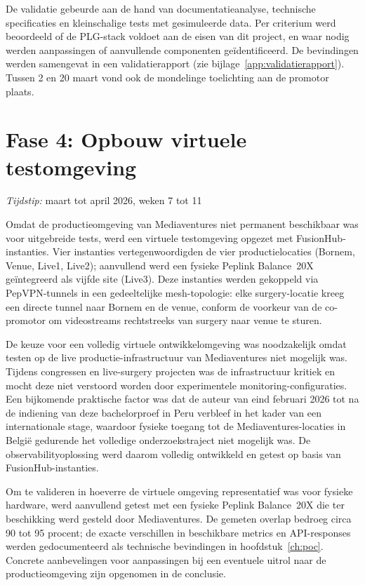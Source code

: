 De validatie gebeurde aan de hand van documentatieanalyse, technische specificaties en kleinschalige tests met gesimuleerde data. Per criterium werd beoordeeld of de PLG-stack voldoet aan de eisen van dit project, en waar nodig werden aanpassingen of aanvullende componenten geïdentificeerd. De bevindingen werden samengevat in een validatierapport (zie bijlage~\ref{app:validatierapport}). Tussen 2 en 20 maart vond ook de mondelinge toelichting aan de promotor plaats.

\section{Fase 4: Opbouw virtuele testomgeving}
\label{sec:fase4}

\emph{Tijdstip:} maart tot april 2026, weken 7 tot 11

Omdat de productieomgeving van Mediaventures niet permanent beschikbaar was voor uitgebreide tests, werd een virtuele testomgeving opgezet met FusionHub-instanties. Vier instanties vertegenwoordigden de vier productielocaties (Bornem, Venue, Live1, Live2); aanvullend werd een fysieke Peplink Balance~20X geïntegreerd als vijfde site (Live3). Deze instanties werden gekoppeld via PepVPN-tunnels in een gedeeltelijke mesh-topologie: elke surgery-locatie kreeg een directe tunnel naar Bornem en de venue, conform de voorkeur van de co-promotor om videostreams rechtstreeks van surgery naar venue te sturen.

De keuze voor een volledig virtuele ontwikkelomgeving was noodzakelijk omdat testen op de live productie-infrastructuur van Mediaventures niet mogelijk was. Tijdens congressen en live-surgery projecten was de infrastructuur kritiek en mocht deze niet verstoord worden door experimentele monitoring-configuraties. Een bijkomende praktische factor was dat de auteur van eind februari 2026 tot na de indiening van deze bachelorproef in Peru verbleef in het kader van een internationale stage, waardoor fysieke toegang tot de Mediaventures-locaties in België gedurende het volledige onderzoekstraject niet mogelijk was. De observabilityoplossing werd daarom volledig ontwikkeld en getest op basis van FusionHub-instanties.

Om te valideren in hoeverre de virtuele omgeving representatief was voor fysieke hardware, werd aanvullend getest met een fysieke Peplink Balance~20X die ter beschikking werd gesteld door Mediaventures. De gemeten overlap bedroeg circa 90 tot 95 procent; de exacte verschillen in beschikbare metrics en API-responses werden gedocumenteerd als technische bevindingen in hoofdstuk~\ref{ch:poc}. Concrete aanbevelingen voor aanpassingen bij een eventuele uitrol naar de productieomgeving zijn opgenomen in de conclusie.

